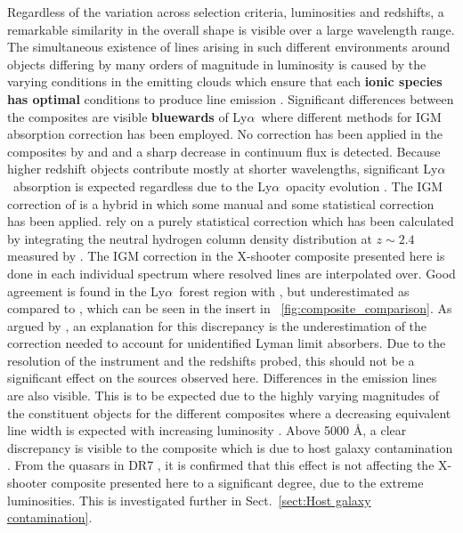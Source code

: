 \documentclass{aa}    %
\newcommand{\figref}[1]{\ref{fig:#1}}
\newcommand{\Fig}[1]{\figurename~\figref{#1}}
\newcommand{\fig}[1]{\Fig{#1}}
\newcommand{\sectionname}{Sect.}
\newcommand{\Sect}[1]{\sectionname~\ref{sect:#1}}
\newcommand{\sect}[1]{\Sect{#1}}
\newcommand{\lya}{Ly$\alpha$}
\begin{document}
Regardless of the variation across selection criteria, luminosities and
redshifts, a remarkable similarity in the overall shape is visible
over a large wavelength range. The simultaneous existence of lines
arising in such different environments around objects differing by
many orders of magnitude in luminosity is caused by the varying
conditions in the emitting clouds which ensure that each \textbf{ionic species has optimal} conditions to produce line emission \citep{Baldwin1995}.
Significant differences between the composites are visible \textbf{bluewards} of
\lya~where different methods for IGM absorption correction has been
employed. No correction has been applied in the composites by
\citet{Francis1991} and \citet{VandenBerk2001} and a sharp decrease in
continuum flux is detected. Because higher redshift objects contribute
mostly at shorter wavelengths, significant \lya~absorption is
expected regardless due to the \lya~opacity evolution
\citep{Moller1990, Madau1995, DallAglio2008}. The IGM correction of
\citet{Telfer2002} is a hybrid in which some manual and some
statistical correction has been applied. \citet{Lusso2015} rely on a purely statistical correction which has been calculated
by integrating the neutral hydrogen column density distribution at $z
\sim 2.4$ measured by \cite{Prochaska2014b}. The IGM correction in the
X-shooter composite presented here is done in each individual spectrum
where resolved lines are interpolated over. Good agreement is found in
the \lya~forest region with \cite{Telfer2002}, but underestimated as
compared to \cite{Lusso2015}, which can be seen in the insert in
\fig{composite_comparison}. As argued by \cite{Lusso2015}, an
explanation for this discrepancy is the underestimation of the
correction needed to account for unidentified Lyman limit
absorbers. Due to the resolution of the instrument and the redshifts
probed, this should not be a significant effect on the sources
observed here.  Differences in the emission lines are also
visible. This is to be expected due to the highly varying magnitudes
of the constituent objects for the different composites where a
decreasing equivalent line width is expected with increasing
luminosity \citep{Baldwin1977}.  Above 5000 \AA, a clear discrepancy
is visible to the \citet{VandenBerk2001} composite which is due to
host galaxy contamination \citep{Glikman2006}. From the quasars in
DR7 \citep{Shen2011}, it is confirmed that this effect is not
affecting the X-shooter composite presented here to a significant
degree, due to the extreme luminosities. This is investigated further
in \sect{Host galaxy
contamination}.
\end{document}
